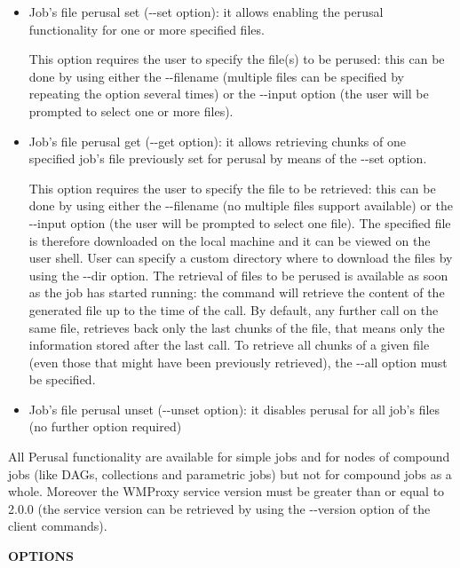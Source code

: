 \begin{itemize}


\item  Job's file perusal set (-{}-set option): it allows enabling the perusal functionality 
for one or more specified files.

This option requires the user to specify the file(s) to be perused: this can be done by using either the 
-{}-filename (multiple files 
can be specified by repeating the option several times) or the -{}-input option (the user will be prompted 
to select one or more files).


\item  Job's file perusal get (-{}-get option): it allows retrieving chunks of one
specified job's file previously set for perusal by means of the -{}-set option.

This option requires the user to specify the file to be retrieved: this can be done by using either the -{}-filename 
(no multiple files support available) or the -{}-input option (the user will be prompted to select one file). 
The specified file is therefore downloaded on the local machine and it can be viewed on the user shell. 
User can specify a custom directory where to download the files by using the -{}-dir option. 
The retrieval of files to be perused 
is available as soon as the job has started running: the command will retrieve the content of the 
generated file up to 
the time of the call. By default, any further call on the same file, retrieves back only the last chunks of the file, 
that means only the information stored after the last call. 
To retrieve all chunks of a given file (even those that might have been previously retrieved), 
the -{}-all option must be specified.


\item  Job's file perusal unset (-{}-unset option): it disables perusal for all job's files 
(no further option required)

\end{itemize}


All Perusal functionality are available for simple jobs and for nodes of compound jobs 
(like DAGs, collections and parametric jobs) 
but not for compound jobs as a whole. Moreover the WMProxy service version must be greater than or 
equal to 2.0.0 
(the service version can be retrieved by using the -{}-version option of the client commands).


\medskip\textbf{OPTIONS}\smallskip



